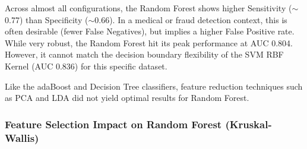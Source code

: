 \documentclass[12pt,a4paper]{article}
\begin{document}
\begin{table}[h!]
\centering
{}
\caption{Impact of Estimators (Fixed $max\_depth=4$)}
\end{table}

Across almost all configurations, the Random Forest shows higher Sensitivity ($\sim$0.77) than Specificity ($\sim$0.66). In a medical or fraud detection context, this is often desirable (fewer False Negatives), but implies a higher False Positive rate.
While very robust, the Random Forest hit its peak performance at AUC 0.804. However, it cannot match the decision boundary flexibility of the SVM RBF Kernel (AUC 0.836) for this specific dataset.

Like the adaBoost and Decision Tree classifiers, feature reduction techniques such as PCA and LDA did not yield optimal results for Random Forest. 

\subsubsection*{Feature Selection Impact on Random Forest (Kruskal-Wallis)}
\end{document}
